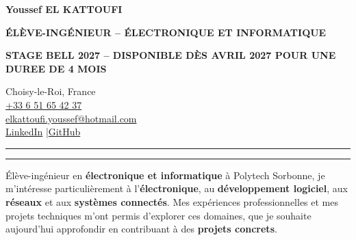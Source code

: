 \documentclass[10pt,a4paper]{extarticle}
\newcommand{\stage}{STAGE BELL 2027 -- DISPONIBLE DÈS AVRIL 2027 POUR UNE DUREE DE 4 MOIS}
\begin{document}
\begin{minipage}[t]{.635\linewidth}
  {\fontsize{21.2}{22.3}\selectfont\bfseries\color{bleu}Youssef EL KATTOUFI}\par\vspace{1.5pt}
  {\fontsize{10.4}{11.7}\selectfont\bfseries\color{rouge}ÉLÈVE-INGÉNIEUR -- ÉLECTRONIQUE ET INFORMATIQUE}\par\vspace{1.1pt}
  {\fontsize{9.5}{10.7}\selectfont\bfseries\color{bleu}\stage}\par
\end{minipage}\hfill
\begin{minipage}[t]{.355\linewidth}\raggedleft
  {\fontsize{9.1}{10.5}\selectfont
  Choisy-le-Roi, France\\
  \href{tel:+33651654237}{+33 6 51 65 42 37}\\
  \href{mailto:elkattoufi.youssef@hotmail.com}{elkattoufi.youssef@hotmail.com}\\
  \href{https://www.linkedin.com/in/youssef-el-kattoufi-5a04a0282/}{LinkedIn} \quad\textcolor{gris}{|}\quad \href{https://github.com/Darkzveller}{GitHub} }
\end{minipage}
\vspace{4.1pt}
\textcolor{rouge}{\rule{1.35cm}{1.75pt}}\hspace{1pt}\textcolor{gris!65}{\rule{\dimexpr\linewidth-1.45cm\relax}{.6pt}}\par\vspace{3.0pt}
{\fontsize{9.6}{11.4}\selectfont
Élève-ingénieur en \textbf{électronique et informatique} à Polytech Sorbonne, je m'intéresse particulièrement à l'\textbf{électronique}, au \textbf{développement logiciel}, aux \textbf{réseaux} et aux \textbf{systèmes connectés}. Mes expériences professionnelles et mes projets techniques m'ont permis d'explorer ces domaines, que je souhaite aujourd'hui approfondir en contribuant à des \textbf{projets concrets}.\par}
\end{document}
